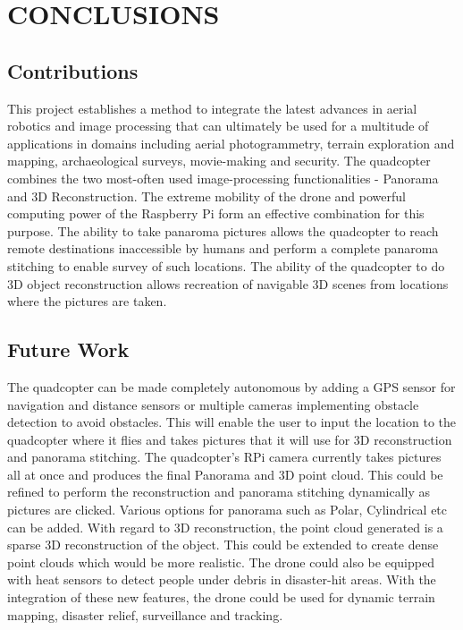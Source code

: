 
\chapter{CONCLUSIONS} %
\section{Contributions}
This project establishes a method to integrate the latest advances in aerial robotics and image processing that can ultimately be used for a multitude of applications in domains including aerial photogrammetry, terrain exploration and mapping, archaeological surveys, movie-making and security. The quadcopter combines the two most-often used image-processing functionalities - Panorama and 3D Reconstruction. The extreme mobility of the drone and powerful computing power of the Raspberry Pi form an effective combination for this purpose.
\newline
\newline
The ability to take panaroma pictures allows the quadcopter to reach remote destinations inaccessible by humans and perform a complete panaroma stitching to enable survey of such locations.
The ability of the quadcopter to do 3D object reconstruction allows recreation of navigable 3D scenes from locations where the pictures are taken.
\section{Future Work}
The quadcopter can be made completely autonomous by adding a GPS sensor for navigation and distance sensors or multiple cameras implementing obstacle detection to avoid obstacles. This will enable the user to input the location to the quadcopter where it flies and takes pictures that it will use for 3D reconstruction and panorama stitching.
\newline
\newline
The quadcopter's RPi camera currently takes pictures all at once and produces the final Panorama and 3D point cloud. This could be refined to perform the reconstruction and panorama stitching dynamically as pictures are clicked. Various options for panorama such as Polar, Cylindrical etc can be added. With regard to 3D reconstruction, the point cloud generated is a sparse 3D reconstruction of the object. This could be extended to create dense point clouds which would be more realistic. 
\newline
\newline
The drone could also be equipped with heat sensors to detect people under debris in disaster-hit areas.
With the integration of these new features, the drone could be used for dynamic terrain mapping, disaster relief, surveillance and tracking.